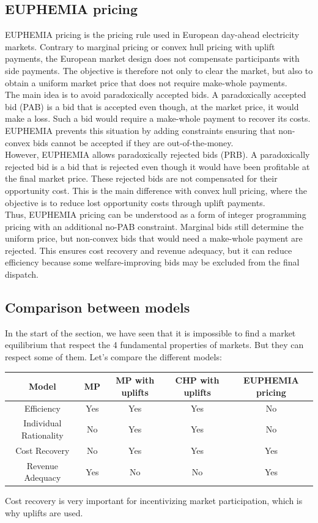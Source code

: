 \documentclass[12pt, openany]{report}
\theoremstyle{definition}
\begin{document}
\subsection{EUPHEMIA pricing}
EUPHEMIA pricing is the pricing rule used in European day-ahead electricity markets. 
Contrary to marginal pricing or convex hull pricing with uplift payments, the European 
market design does not compensate participants with side payments. The objective is 
therefore not only to clear the market, but also to obtain a uniform market price that 
does not require make-whole payments.\\
The main idea is to avoid paradoxically accepted bids. A paradoxically accepted bid 
(PAB) is a bid that is accepted even though, at the market price, it would make a loss. 
Such a bid would require a make-whole payment to recover its costs. EUPHEMIA prevents 
this situation by adding constraints ensuring that non-convex bids cannot be accepted 
if they are out-of-the-money.\\
However, EUPHEMIA allows paradoxically rejected bids (PRB). A paradoxically rejected 
bid is a bid that is rejected even though it would have been profitable at the final 
market price. These rejected bids are not compensated for their opportunity cost. 
This is the main difference with convex hull pricing, where the objective is to reduce 
lost opportunity costs through uplift payments.\\
Thus, EUPHEMIA pricing can be understood as a form of integer programming pricing with 
an additional no-PAB constraint. Marginal bids still determine the uniform price, but 
non-convex bids that would need a make-whole payment are rejected. This ensures cost 
recovery and revenue adequacy, but it can reduce efficiency because some welfare-improving bids may be excluded from the final dispatch.
\subsection{Comparison between models}
In the start of the section, we have seen that it is impossible to find a market equilibrium that respect the 4 fundamental properties of markets. But they can respect some of them. Let's compare the different models:
\begin{center}
    \begin{tabular}{|c|c|c|c|c|}
        \hline
        Model & MP & MP with uplifts & CHP with uplifts & EUPHEMIA pricing \\
        \hline
        Efficiency & Yes & Yes & Yes & No \\
        \hline
        Individual Rationality & No & Yes & Yes & No \\
        \hline
        Cost Recovery & No & Yes & Yes & Yes \\
        \hline
        Revenue Adequacy & Yes & No & No & Yes \\
        \hline
    \end{tabular}
\end{center}
Cost recovery is very important for incentivizing market participation, which is why uplifts are used.
\end{document}
